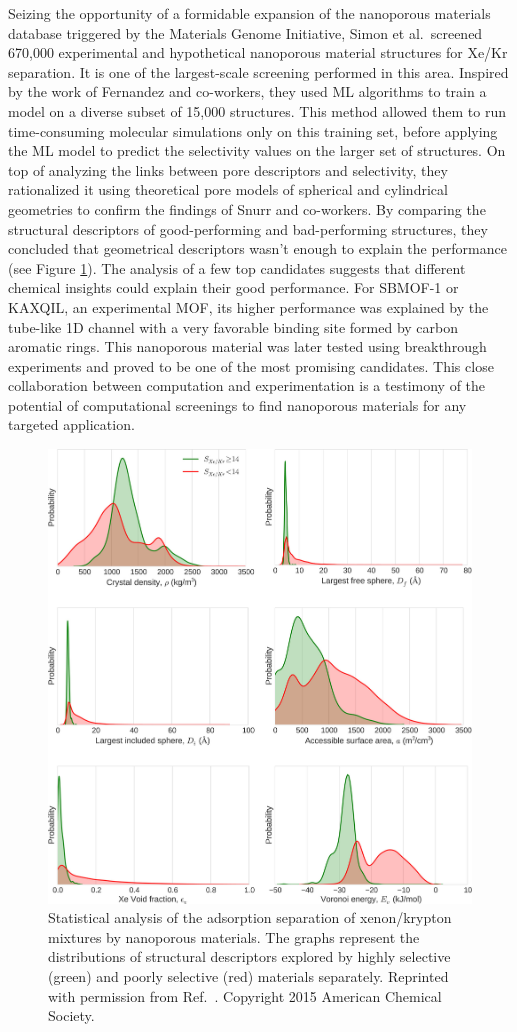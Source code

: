 \documentclass[main.tex]{subfiles}
\begin{document}
Seizing the opportunity of a formidable expansion of the nanoporous materials database triggered by the Materials Genome Initiative, Simon et al.\ screened 670,000 experimental and hypothetical nanoporous material structures for Xe/Kr separation.\cite{Simon_2015} It is one of the largest-scale screening performed in this area. Inspired by the work of Fernandez and co-workers,\cite{Fernandez_2013} they used ML algorithms to train a model on a diverse subset of 15,000 structures. This method allowed them to run time-consuming molecular simulations only on this training set, before applying the ML model to predict the selectivity values on the larger set of structures. On top of analyzing the links between pore descriptors and selectivity, they rationalized it using theoretical pore models of spherical and cylindrical geometries to confirm the findings of Snurr and co-workers.\cite{Ryan_2010,Sikora_2012} By comparing the structural descriptors of good-performing and bad-performing structures, they concluded that geometrical descriptors wasn't enough to explain the performance (see Figure \ref{fgr:Simon2015}). The analysis of a few top candidates suggests that different chemical insights could explain their good performance. For SBMOF-1 or KAXQIL,\cite{KAXQIL} an experimental MOF, its higher performance was explained by the tube-like 1D channel with a very favorable binding site formed by carbon aromatic rings. This nanoporous material was later tested using breakthrough experiments and proved to be one of the most promising candidates.\cite{Banerjee_2016} This close collaboration between computation and experimentation is a testimony of the potential of computational screenings to find nanoporous materials for any targeted application.

\begin{figure}[ht]
\centering
  \includegraphics[width=0.7\linewidth]{figures/1-screening/Simon_2015_descriptors.jpeg}
  \caption{Statistical analysis of the adsorption separation of xenon/krypton mixtures by nanoporous materials. The graphs represent the distributions of structural descriptors explored by highly selective (green) and poorly selective (red) materials separately. Reprinted with permission from Ref.~. Copyright 2015 American Chemical Society.}
  \label{fgr:Simon2015}
\end{figure}
\end{document}
